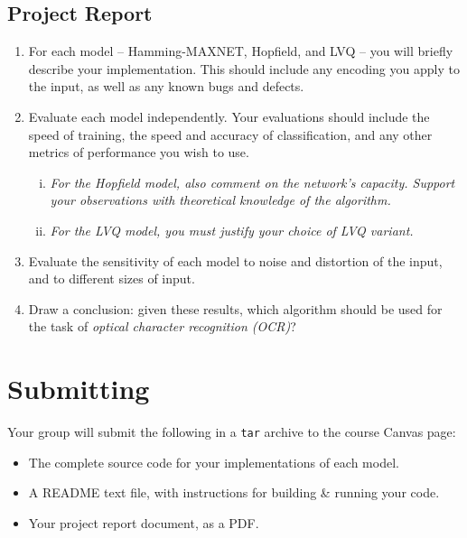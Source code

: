\documentclass[11pt]{cselabheader}
\begin{document}
\subsection{Project Report}
\begin{enumerate}
  \item For each model -- Hamming-MAXNET, Hopfield, and LVQ -- you will briefly describe your implementation. This should include any encoding you apply to the input, as well as any known bugs and defects.

  \item Evaluate each model independently. Your evaluations should include the speed of training, the speed and accuracy of classification, and any other metrics of performance you wish to use.
  \begin{enumerate}[i.]
    \item \textit{For the Hopfield model, also comment on the network's capacity. Support your observations with theoretical knowledge of the algorithm.}
    \item \textit{For the LVQ model, you must justify your choice of LVQ variant.}
  \end{enumerate}

  \item Evaluate the sensitivity of each model to noise and distortion of the input, and to different sizes of input.

  \item Draw a conclusion: given these results, which algorithm should be used for the task of \textit{optical character recognition (OCR)}?
\end{enumerate}



\pagebreak

\section{Submitting}

Your group will submit the following in a \texttt{tar} archive to the course Canvas page:
\begin{itemize}
  \item The complete source code for your implementations of each model.
  \item A README text file, with instructions for building \& running your code.
  \item Your project report document, as a PDF.
\end{itemize}
\end{document}
